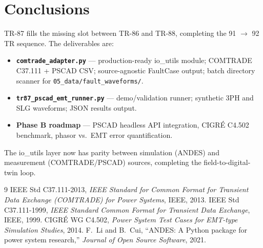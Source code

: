 \documentclass[11pt,a4paper]{article}
\begin{document}
\section{Conclusions}
\label{sec:conclusions}

TR-87 fills the missing slot between TR-86 and TR-88, completing the
91 $\to$ 92 TR sequence.  The deliverables are:

\begin{itemize}
  \item \textbf{\texttt{comtrade\_adapter.py}} — production-ready io\_utils
        module; COMTRADE C37.111 + PSCAD CSV; source-agnostic FaultCase output;
        batch directory scanner for \texttt{05\_data/fault\_waveforms/}.
  \item \textbf{\texttt{tr87\_pscad\_emt\_runner.py}} — demo/validation runner;
        synthetic 3PH and SLG waveforms; JSON results output.
  \item \textbf{Phase B roadmap} — PSCAD headless API integration, CIGRÉ
        C4.502 benchmark, phasor vs.\ EMT error quantification.
\end{itemize}

The io\_utils layer now has parity between simulation (ANDES) and measurement
(COMTRADE/PSCAD) sources, completing the field-to-digital-twin loop.

\begin{thebibliography}{9}
 IEEE Std C37.111-2013,
  \emph{IEEE Standard for Common Format for Transient Data Exchange (COMTRADE)
  for Power Systems}, IEEE, 2013.
 IEEE Std C37.111-1999,
  \emph{IEEE Standard Common Format for Transient Data Exchange}, IEEE, 1999.
 CIGRÉ WG C4.502,
  \emph{Power System Test Cases for EMT-type Simulation Studies}, 2014.
 F.~Li and B.~Cui,
  ``ANDES: A Python package for power system research,''
  \emph{Journal of Open Source Software}, 2021.
\end{thebibliography}
\end{document}
